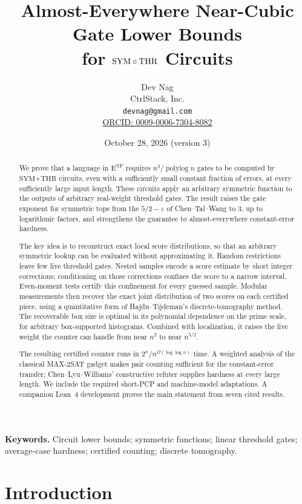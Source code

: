 \documentclass[11pt,letterpaper]{article}
\title{Almost-Everywhere Near-Cubic Gate Lower Bounds\\
for \texorpdfstring{$\SYM\circ\THR$}{SYM-THR} Circuits}
\author{Dev Nag\\CtrlStack, Inc.\\\texttt{devnag@gmail.com}\\
\href{https://orcid.org/0009-0006-7304-8082}{ORCID: 0009-0006-7304-8082}}
\date{October 28, 2026 (version 3)}
\theoremstyle{definition}
\theoremstyle{remark}
\newcommand{\THR}{\mathrm{THR}}
\newcommand{\SYM}{\mathrm{SYM}}
\newcommand{\ENP}{\mathrm{E}^{\mathrm{NP}}}
\begin{document}
\maketitle
\begin{abstract}
We prove that a language in \(\ENP\) requires
\(n^3/\operatorname{polylog}n\) gates to be computed by
\(\SYM\circ\THR\) circuits, even with a sufficiently small constant
fraction of errors, at every sufficiently large input length.
These circuits apply an arbitrary symmetric function to the outputs
of arbitrary real-weight threshold gates. The result raises the gate
exponent for symmetric tops from the \(5/2-\varepsilon\) of
Chen--Tal--Wang to \(3\), up to logarithmic factors, and strengthens
the guarantee to almost-everywhere constant-error hardness.

The key idea is to reconstruct exact local score distributions, so
that an arbitrary symmetric lookup can be evaluated without
approximating it. Random restrictions leave few live threshold gates.
Nested samples encode a score estimate by short integer corrections;
conditioning on those corrections confines the score to a narrow
interval. Even-moment tests certify this confinement for every guessed
sample. Modular measurements then recover the exact joint distribution
of two scores on each certified piece, using a quantitative form of
Hajdu--Tijdeman's discrete-tomography method. The recoverable box size
is optimal in its polynomial dependence on the prime scale, for
arbitrary box-supported histograms. Combined with localization, it
raises the live weight the counter can handle from near \(n^2\) to near
\(n^{5/2}\).

The resulting certified counter runs in
\(2^n/n^{\Omega(\log\log n)}\) time. A weighted analysis of the
classical MAX-2SAT gadget makes pair counting sufficient for the
constant-error transfer; Chen--Lyu--Williams' constructive refuter
supplies hardness at every large length. We include the required
short-PCP and machine-model adaptations. A companion Lean~4
development proves the main statement from seven cited results.
\end{abstract}

\medskip
\noindent\textbf{Keywords.} Circuit lower bounds; symmetric functions;
linear threshold gates; average-case hardness; certified counting;
discrete tomography.

\clearpage
\tableofcontents
\clearpage

\section{Introduction}\label{sec:intro}
\end{document}
